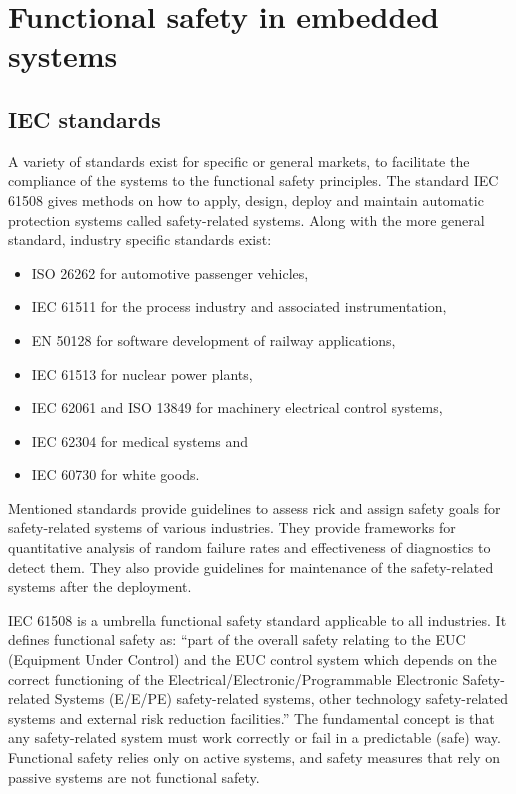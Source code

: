\chapter{Functional safety in embedded systems}
\label{functional_safety}

\section{IEC standards}

A variety of standards exist for specific or general markets, to facilitate the compliance of the systems to the functional safety principles. The standard IEC 61508 gives methods on how to apply, design, deploy and maintain automatic protection systems called safety-related systems.
Along with the more general standard, industry specific standards exist:
\begin{itemize}

    \item ISO 26262 for automotive passenger vehicles,
    \item IEC 61511 for the process industry and associated instrumentation,
    \item EN 50128 for software development of railway applications,
    \item IEC 61513 for nuclear power plants,
    \item IEC 62061 and ISO 13849 for machinery electrical control systems,
    \item IEC 62304 for medical systems and
    \item IEC 60730 for white goods.

\end{itemize}

Mentioned standards provide guidelines to assess rick and assign safety goals for safety-related systems of various industries. They provide frameworks for quantitative analysis of random failure rates and effectiveness of diagnostics to detect them. They also provide guidelines for maintenance of the safety-related systems after the deployment.

IEC 61508 is a umbrella functional safety standard applicable to all industries. It defines functional safety as: “part of the overall safety relating to the EUC (Equipment Under Control) and the EUC control system which depends on the correct functioning of the Electrical/Electronic/Programmable Electronic Safety-related Systems (E/E/PE) safety-related systems, other technology safety-related systems and external risk reduction facilities.” The fundamental concept is that any safety-related system must work correctly or fail in a predictable (safe) way. Functional safety relies only on active systems, and safety measures that rely on passive systems are not functional safety. \citep{func_safety_explained}

